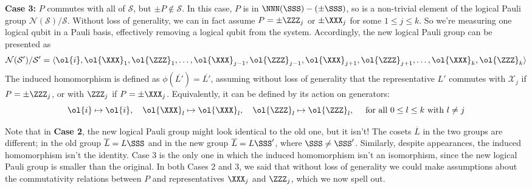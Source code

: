 \begin{theorem}
    \textbf{Case 3:} $P$ commutes with all of $\mathcal{S}$, but $\pm P \notin \mathcal{S}$.
    In this case, $P$ is in $\NNN(\SSS) - (\pm \SSS)$, so is a non-trivial element of the logical Pauli group $\mathcal{N}(\mathcal{S})/\mathcal{S}$.
    Without loss of generality, we can in fact assume $P = \pm \ZZZ_j$ or $\pm \XXX_j$ for some $1 \leq j \leq k$.
    So we're measuring one logical qubit in a Pauli basis, effectively removing a logical qubit from the system.
    Accordingly, the new logical Pauli group can be presented as
    \begin{equation}
        \mathcal{N}(\mathcal{S}')/\mathcal{S}' = \langle \ol{i}, \ol{\XXX}_1, \ol{\ZZZ}_1, \ldots, \ol{\XXX}_{j-1}, \ol{\ZZZ}_{j-1}, \ol{\XXX}_{j+1}, \ol{\ZZZ}_{j+1}, \ldots, \ol{\XXX}_{k}, \ol{\ZZZ}_{k} \rangle
    \end{equation}
    The induced homomorphism is defined as $\phi(\overline{L'}) = \overline{L'}$, assuming without loss of generality that the representative $L'$ commutes with $\mathcal{X}_j$ if $P = \pm \ZZZ_j$, or with $\ZZZ_j$ if $P = \pm \XXX_j$.
    Equivalently, it can be defined by its action on generators:
    \begin{equation}\label{eq:case_3_phi_definition_generators}
        \ol{i} \mapsto \ol{i}, \quad
        \ol{\XXX}_l \mapsto \ol{\XXX}_l, \quad
        \ol{\ZZZ}_l \mapsto \ol{\ZZZ}_l, \quad
        \text { for all $0 \leq l \leq k$ with $l \neq j$}
    \end{equation}
\end{theorem}

Note that in \textbf{Case 2}, the new logical Pauli group might look identical to the old one, but it isn't!
The cosets $\overline{L}$ in the two groups are different; in the old group $\overline{L} = L\SSS$ and in the new group $\overline{L} = L\SSS'$, where $\SSS \neq \SSS'$.
Similarly, despite appearances, the induced homomorphism isn't the identity.
Case 3 is the only one in which the induced homomorphism isn't an isomorphism, since the new logical Pauli group is smaller than the original.
In both Cases 2 and 3, we said that without loss of generality we could make assumptions about the commutativity relations between $P$ and representatives $\XXX_j$ and $\ZZZ_j$, which we now spell out.


